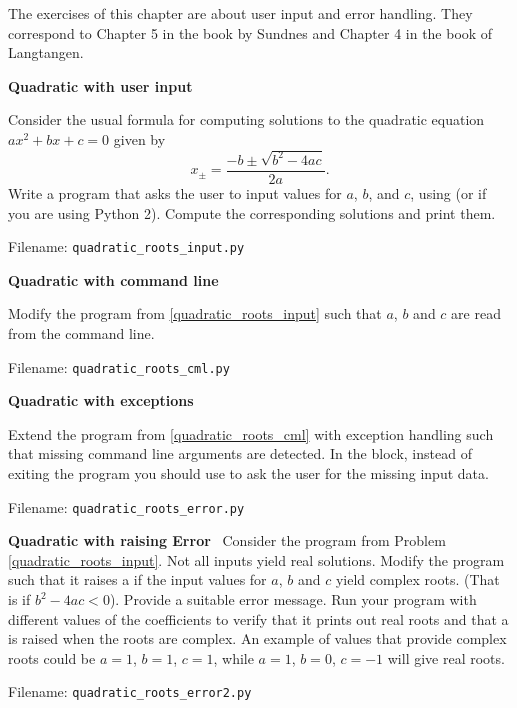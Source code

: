 The exercises of this chapter are about user input and error handling. They
correspond to Chapter 5 in the book by Sundnes and Chapter 4 in the book of Langtangen.

\begin{Problem}{\textbf{Quadratic with user input}} \label{quadratic_roots_input}

\noindent Consider the usual formula for computing solutions to the quadratic equation
$ax^2+bx+c=0$ given by
\begin{equation*}
    x_{\pm}=\frac{-b\pm\sqrt{b^2-4ac}}{2a}.
\end{equation*}
Write a program that asks the user to input values for $a$, $b$, and $c$, using 
(or  if you are using Python 2). Compute the corresponding solutions and print them.

Filename: \texttt{quadratic\_roots\_input.py}
\end{Problem}

\begin{Problem}{\textbf{Quadratic with command line}} \label{quadratic_roots_cml}

\noindent Modify the program from \ref{quadratic_roots_input} such that $a$, $b$ and $c$ are read from the command line.

Filename: \texttt{quadratic\_roots\_cml.py}
\end{Problem}


\begin{Problem}{\textbf{Quadratic with exceptions}}

\noindent Extend the program from \ref{quadratic_roots_cml} with exception handling such that missing command line arguments are
detected. In the  block, instead of exiting the program you should
use  to ask the user for the missing input data.

Filename: \texttt{quadratic\_roots\_error.py}
\end{Problem}

\begin{Problem}{\textbf{Quadratic with raising Error}} \label{prob43} \
Consider the program from Problem \ref{quadratic_roots_input}. Not all inputs yield real solutions.
Modify the program such that it raises a \pythoninline{ValueError} if the input values for $a$, $b$ and $c$
yield complex roots. (That is if $b^2 - 4ac < 0$). Provide a suitable error  message. Run your program with different
values of the coefficients to verify that it prints out real roots and that a \pythoninline{ValueError} is raised
when the roots are complex. An example of values that provide complex roots could be $a=1$, $b=1$, $c=1$,
while $a=1$, $b=0$, $c=-1$ will give real roots.

Filename: \texttt{quadratic\_roots\_error2.py}
\end{Problem}

